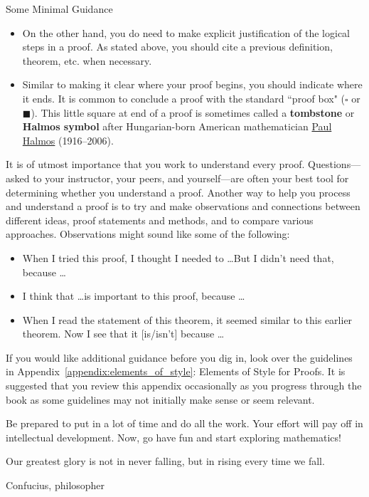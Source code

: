 \begin{section}{Some Minimal Guidance}
\begin{itemize}
\item On the other hand, you do need to make explicit justification of the logical steps in a proof.  As stated above, you should cite a previous definition, theorem, etc. when necessary.
\item Similar to making it clear where your proof begins, you should indicate where it ends.  It is common to conclude a proof with the standard ``proof box" ($\square$ or $\blacksquare$).  This little square at end of a proof is sometimes called a \textbf{tombstone} or \textbf{Halmos symbol} after Hungarian-born American mathematician \href{https://en.wikipedia.org/wiki/Paul_Halmos}{Paul Halmos} (1916--2006).
\end{itemize}

It is of utmost importance that you work to understand every proof.  Questions---asked to your instructor, your peers, and yourself---are often your best tool for determining whether you understand a proof.  Another way to help you process and understand a proof is to try and make observations and connections between different ideas, proof statements and methods, and to compare various approaches. Observations might sound like some of the following:
\begin{itemize}
\item When I tried this proof, I thought I needed to \ldots But I didn't need that, because \ldots
\item I think that \ldots is important to this proof, because \ldots
\item When I read the statement of this theorem, it seemed similar to this earlier theorem. Now I see that it [is/isn't] because \ldots
\end{itemize}

If you would like additional guidance before you dig in, look over the guidelines in Appendix~\ref{appendix:elements_of_style}: Elements of Style for Proofs. It is suggested that you review this appendix occasionally as you progress through the book as some guidelines may not initially make sense or seem relevant. 

Be prepared to put in a lot of time and do all the work. Your effort will pay off in intellectual development. Now, go have fun and start exploring mathematics!

\epigraph{Our greatest glory is not in never falling, but in rising every time we fall.}{Confucius, philosopher}

\end{section}